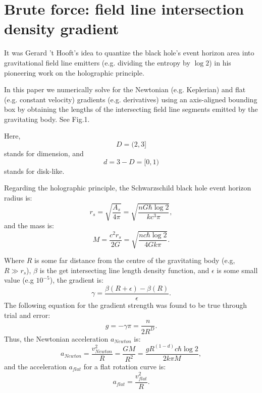 \documentclass[12pt]{article}
\begin{document}
\section{Brute force: field line intersection density gradient}

It was Gerard 't Hooft's idea to quantize the black hole's event horizon area into gravitational field line emitters (e.g. dividing the entropy by $\log 2$) in his pioneering work on the holographic principle.

In this paper we numerically solve for the Newtonian (e.g. Keplerian) and flat (e.g. constant velocity) gradients (e.g. derivatives) using an axis-aligned bounding box by obtaining the lengths of the intersecting field line segments emitted by the gravitating body. See Fig.1. 

Here, 
\begin{equation}
D = (2, 3]
\end{equation}
stands for dimension, and 
\begin{equation}
d = 3 - D = [0, 1)
\end{equation}
stands for disk-like.

Regarding the holographic principle, the Schwarzschild black hole event horizon radius is:
\begin{equation}
r_s = \sqrt{\frac{A_s}{4 \pi}} = \sqrt{\frac{n G \hbar \log 2}{k c^3 \pi}},
\end{equation}
and the mass is:
\begin{equation}
M = \frac{c^2 r_s}{2 G} = \sqrt{\frac{n c \hbar \log 2}{4 G k \pi}}. 
\end{equation}

Where $R$ is some far distance from the centre of the gravitating body (e.g, $R \gg r_s$), $\beta$ is the get intersecting line length density function, and $\epsilon$ is some small value (e.g $10^{-5}$), the gradient is:
\begin{equation}
\gamma = \frac{\beta(R + \epsilon) - \beta(R)}{\epsilon}.
\end{equation}
The following equation for the gradient strength was found to be true through trial and error:
\begin{equation}
g = -\gamma \pi = \frac{n}{2 R^D}.
\end{equation}
Thus, the Newtonian acceleration $a_{\textit{Newton}}$ is:
\begin{equation}
a_{\textit{Newton}} = \frac{v_{\textit{Newton}}^2}{R} = \frac{GM}{R^2} = \frac{g R^{(1 - d)} c \hbar \log 2}{2 k \pi M},
\end{equation}
and the acceleration $a_{\textit{flat}}$ for a flat rotation curve is:
\begin{equation}
a_{\textit{flat}} = \frac{v_{\textit{flat}}^2}{R}.
\end{equation}
\end{document}
